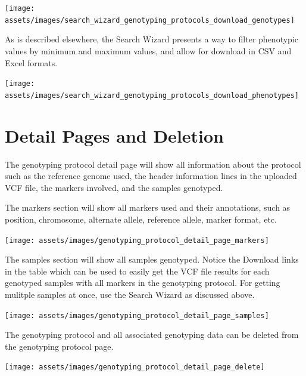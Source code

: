 \documentclass[
  12pt,
]{book}
\begin{document}
\begin{center}\texttt{[image: assets/images/search\_wizard\_genotyping\_protocols\_download\_genotypes]} \end{center}

As is described elsewhere, the Search Wizard presents a way to filter phenotypic values by minimum and maximum values, and allow for download in CSV and Excel formats.

\begin{center}\texttt{[image: assets/images/search\_wizard\_genotyping\_protocols\_download\_phenotypes]} \end{center}

\hypertarget{detail-pages-and-deletion}{%
\section{Detail Pages and Deletion}\label{detail-pages-and-deletion}}

The genotyping protocol detail page will show all information about the protocol such as the reference genome used, the header information lines in the uploaded VCF file, the markers involved, and the samples genotyped.

The markers section will show all markers used and their annotations, such as position, chromosome, alternate allele, reference allele, marker format, etc.

\begin{center}\texttt{[image: assets/images/genotyping\_protocol\_detail\_page\_markers]} \end{center}

The samples section will show all samples genotyped. Notice the Download links in the table which can be used to easily get the VCF file results for each genotyped samples with all markers in the genotyping protocol. For getting mulitple samples at once, use the Search Wizard as discussed above.

\begin{center}\texttt{[image: assets/images/genotyping\_protocol\_detail\_page\_samples]} \end{center}

The genotyping protocol and all associated genotyping data can be deleted from the genotyping protocol page.

\begin{center}\texttt{[image: assets/images/genotyping\_protocol\_detail\_page\_delete]} \end{center}
\end{document}
